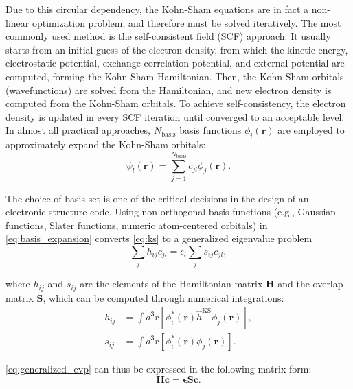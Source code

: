 \documentclass{report}
\begin{document}
Due to this circular dependency, the Kohn-Sham equations are in fact a non-linear optimization problem, and therefore must be solved iteratively.  The most commonly used method is the self-consistent field (SCF) approach.  It usually starts from an initial guess of the electron density, from which the kinetic energy, electrostatic potential, exchange-correlation potential, and external potential are computed, forming the Kohn-Sham Hamiltonian.  Then, the Kohn-Sham orbitals (wavefunctions) are solved from the Hamiltonian, and new electron density is computed from the Kohn-Sham orbitals.  To achieve self-consistency, the electron density is updated in every SCF iteration until converged to an acceptable level.\\

In almost all practical approaches, $N_\text{basis}$ basis functions ${\phi_i(\boldsymbol{r})}$ are employed to approximately expand the Kohn-Sham orbitals:\\
\begin{equation}
\label{eq:basis_expansion}
\psi_l(\boldsymbol{r}) = \sum_{j=1}^{N_\text{basis}} c_{jl} \phi_j(\boldsymbol{r}) .
\end{equation}

The choice of basis set is one of the critical decisions in the design of an electronic structure code.  Using non-orthogonal basis functions (e.g., Gaussian functions, Slater functions, numeric atom-centered orbitals) in \ref{eq:basis_expansion} converts \ref{eq:ks} to a generalized eigenvalue problem\\
\begin{equation}
\label{eq:generalized_evp}
\sum_j h_{ij} c_{jl} = \epsilon_l \sum_j s_{ij} c_{jl} ,
\end{equation}

where $h_{ij}$ and $s_{ij}$ are the elements of the Hamiltonian matrix $\boldsymbol{H}$ and the overlap matrix $\boldsymbol{S}$, which can be computed through numerical integrations:\\
\begin{equation}
\label{eq:ham_ovlp_integration}
\begin{split}
h_{ij} & = \int d^3 r [\phi_i^*(\boldsymbol{r}) \hat{h}^\text{KS} \phi_j(\boldsymbol{r})] ,\\
s_{ij} & = \int d^3 r [\phi_i^*(\boldsymbol{r}) \phi_j(\boldsymbol{r})] .
\end{split}
\end{equation}

\ref{eq:generalized_evp} can thus be expressed in the following matrix form:\\
\begin{equation}
\label{eq:generalized_evp_matrix}
\boldsymbol{H} \boldsymbol{c} = \boldsymbol{\epsilon} \boldsymbol{S} \boldsymbol{c} .
\end{equation}
\end{document}
